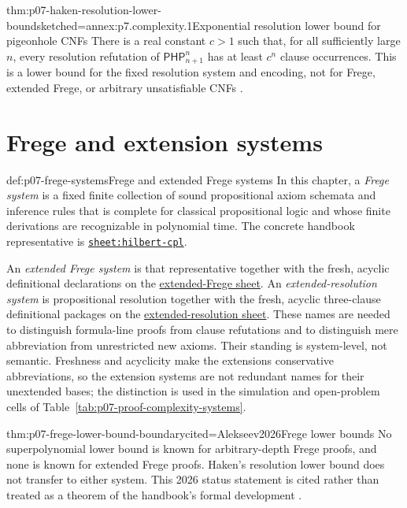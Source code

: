 \begin{hbtheorem}{thm:p07-haken-resolution-lower-bound}{sketched=annex:p7.complexity.1}{Exponential resolution lower bound for pigeonhole CNFs}
There is a real constant \(c>1\) such that, for all sufficiently large
\(n\), every resolution refutation of
\(\mathsf{PHP}^{n}_{n+1}\) has at least \(c^n\) clause occurrences.  This is
a lower bound for the fixed resolution system and encoding, not for Frege,
extended Frege, or arbitrary unsatisfiable CNFs
\cite{Haken1985,BeamePitassi1998}.
\end{hbtheorem}

\section{Frege and extension systems}
\label{sec:p07-frege-systems}

\begin{hbdefinition}{def:p07-frege-systems}{Frege and extended Frege systems}
In this chapter, a \emph{Frege system} is a fixed finite collection of sound
propositional axiom schemata and inference rules that is complete for
classical propositional logic and whose finite derivations are recognizable
in polynomial time.  The concrete handbook representative is
\hyperref[sheet:hilbert-cpl]{\texttt{sheet:hilbert-cpl}}.

An \emph{extended Frege system} is that representative together with the
fresh, acyclic definitional declarations on the
\hyperref[sheet:extended-frege-cpl]{extended-Frege sheet}.
An \emph{extended-resolution system} is propositional resolution together
with the fresh, acyclic three-clause definitional packages on
the \hyperref[sheet:extended-resolution-cpl]{extended-resolution sheet}.
These names are needed to distinguish formula-line proofs from clause
refutations and to distinguish mere abbreviation from unrestricted new
axioms.  Their standing is system-level, not semantic.  Freshness and
acyclicity make the extensions conservative abbreviations, so the extension
systems are not redundant names for their unextended bases; the distinction
is used in the simulation and open-problem cells of
Table~\ref{tab:p07-proof-complexity-systems}.
\end{hbdefinition}

\begin{hbtheorem}{thm:p07-frege-lower-bound-boundary}{cited=Alekseev2026}{Frege lower bounds}
No superpolynomial lower bound is known for arbitrary-depth Frege proofs, and
none is known for extended Frege proofs.  Haken's resolution lower bound does
not transfer to either system.  This 2026 status statement is cited rather
than treated as a theorem of the handbook's formal development
\cite{Krajicek2019,Alekseev2026}.
\end{hbtheorem}

